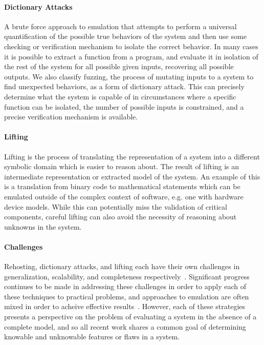 \paragraph{Dictionary Attacks}
A brute force approach to emulation that attempts to perform a universal quantification of the possible true behaviors of the system and then use some checking or verification mechanism to isolate the correct behavior.
In many cases it is possible to extract a function from a program, and evaluate it in isolation of the rest of the system for all possible given inputs, recovering all possible outputs.
We also classify fuzzing, the process of mutating inputs to a system to find unexpected behaviors, as a form of dictionary attack.
This can precisely determine what the system is capable of in circumstances where a specific function can be isolated, the number of possible inputs is constrained, and a precise verification mechanism is available.

\paragraph{Lifting}
Lifting is the process of translating the representation of a system into a different symbolic domain which is easier to reason about.
The result of lifting is an intermediate representation or extracted model of the system.
An example of this is a translation from binary code to mathematical statements which can be emulated outside of the complex context of software, e.g. one with hardware device models.
While this can potentially miss the validation of critical components, careful lifting can also avoid the necessity of reasoning about unknowns in the system.

\paragraph{Challenges}
Rehosting, dictionary attacks, and lifting each have their own challenges in generalization, scalability, and completeness respectively~\cite{wright2021challenges, delaune2004theory, reps2006intermediate}.
Significant progress continues to be made in addressing these challenges in order to apply each of these techniques to practical problems, and approaches to emulation are often mixed in order to acheive effective results~\cite{p2im2020, clementshalucinator, li2018fuzzing, zheng2019firm, yun2018qsym, borzacchiello2021fuzzolic}.
However, each of these strategies presents a perspective on the problem of evaluating a system in the absence of a complete model, and so all recent work shares a common goal of determining knowable and unknowable features or flaws in a system.

